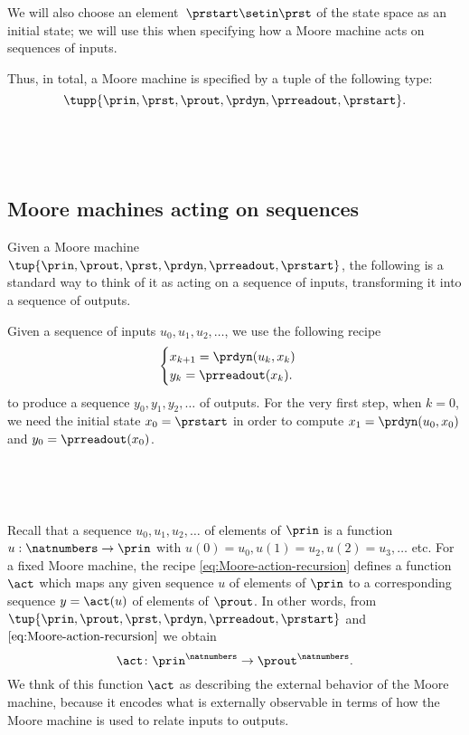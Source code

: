 We will also choose an element~$\prstart \setin \prst$ of the state space as an initial state; we will use this when specifying how a Moore machine acts on sequences of inputs.

Thus, in total, a Moore machine is specified by a tuple of the following type:
\begin{equation}
    \label{eq:moore-tuple}
    \tupp{\prin,\prst,\prout,\prdyn,\prreadout,\prstart}.
\end{equation}

\


\

\subsection{Moore machines acting on sequences}

Given a Moore machine $\tup{\prin, \prout, \prst, \prdyn, \prreadout, \prstart}$, the following is a standard way to think of it as acting on a sequence of inputs, transforming it into a sequence of outputs.

Given a sequence of inputs $u_0, u_1, u_2, \dots $, we use the following recipe
\begin{equation}
    \label{eq:Moore-action-recursion}
    \begin{cases}
        x_{k+1} = \prdyn(u_k, x_k) \\
        y_{k}   = \prreadout(x_{k}).
    \end{cases}
\end{equation}
 to produce a sequence $y_0, y_1, y_2, \dots $ of outputs. For the very first step, when $k = 0$, we need the initial state $x_0 = \prstart$ in order to compute $x_1 = \prdyn(u_0, x_0)$ and $y_0 = \prreadout(x_0)$.

 \


\

Recall that a sequence $u_0, u_1, u_2, \dots$ of elements of $\prin$ is a function $u : \natnumbers \to \prin$ with $u(0) = u_0, u(1) = u_2, u(2) = u_3, \dots$ etc. For a fixed Moore machine, the recipe \cref{eq:Moore-action-recursion} defines a function $\act$ which maps any given sequence $u$ of elements of $\prin$ to a corresponding sequence $y = \act(u)$ of elements of $\prout$. In other words, from $\tup{\prin, \prout, \prst, \prdyn, \prreadout, \prstart}$ and $\cref{eq:Moore-action-recursion}$ we obtain $$\act \colon \prin^\natnumbers \to \prout^\natnumbers.$$ We thnk of this function $\act$ as describing the external behavior of the Moore machine, because it encodes what is externally observable in terms of how the Moore machine is used to relate inputs to outputs.



